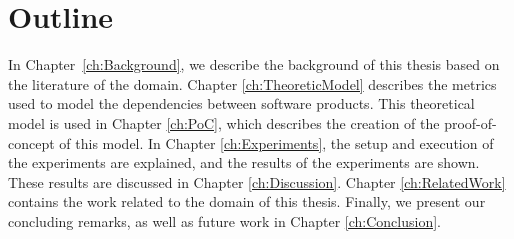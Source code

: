 \section{Outline}
In Chapter~\ref{ch:Background}, we describe the background of this thesis based on the literature of the domain.
Chapter \ref{ch:TheoreticModel} describes the metrics used to model the dependencies between software products.
This theoretical model is used in Chapter \ref{ch:PoC}, which describes the creation of the proof-of-concept of this model.
In Chapter \ref{ch:Experiments}, the setup and execution of the experiments are explained, and the results of the experiments are shown. These results are discussed in Chapter \ref{ch:Discussion}. Chapter \ref{ch:RelatedWork} contains the work related to the domain of this thesis.
Finally, we present our concluding remarks, as well as future work in Chapter \ref{ch:Conclusion}.
